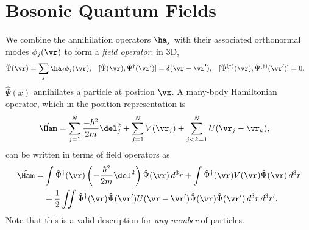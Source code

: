 \documentclass[qo.tex]{subfiles}
\begin{document}
\section{Bosonic Quantum Fields}
We combine the annihilation operators $\ha_j$ with their associated orthonormal modes $\phi_j(\vr)$ to form a \emph{field operator}: in 3D, 
\begin{align}
    \hat{\Psi}(\vr) &= \sum_j \ha_j\phi_j(\vr), & [\hat{\Psi}(\vr),\hat{\Psi}^\dagger(\vr')] &= \delta(\vr-\vr'), & [\hat{\Psi}^{(\dagger)}(\vr),\hat{\Psi}^{(\dagger)}(\vr')] &= 0.
\end{align}
$\hat{\Psi}(x)$ annihilates a particle at position $\vx$.
A many-body Hamiltonian operator, which in the position representation is
\begin{align}
    \hat{\Ham} &= \sum_{j=1}^N \frac{-\hbar^2}{2m}\del_j^2 + \sum_{j=1}^N V(\vr_j) + \sum_{j<k=1}^N U(\vr_j-\vr_k),
\end{align} 
can be written in terms of field operators as 
\begin{align}
    \begin{split}
        \hat{\Ham} = &\int \hat{\Psi}^\dagger(\vr)\left(-\frac{\hbar^2}{2m}\del^2\right)\hat{\Psi}(\vr)\,d^3r + \int \hat{\Psi}^\dagger(\vr)V(\vr)\hat{\Psi}(\vr)\,d^3 r \\
                     &+\frac12 \iint \hat{\Psi}^\dagger(\vr)\hat{\Psi}(\vr')U(\vr-\vr')\hat{\Psi}(\vr)\hat{\Psi}(\vr')\,d^3r\,d^3r'.
    \end{split}
\end{align}
Note that this is a valid description for \emph{any number} of particles.
\end{document}
